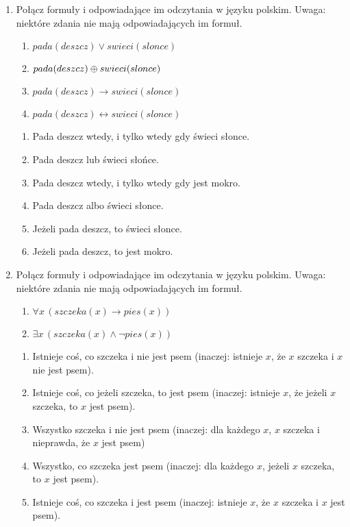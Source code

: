 \documentclass{mwart}
\newcommand{\xor}{\ensuremath\oplus}
\renewcommand{\iff}{\ensuremath\leftrightarrow}
\renewcommand{\iff}{\leftrightarrow}
\begin{document}
\begin{enumerate}
	\item Połącz formuły i odpowiadające im odczytania w języku polskim. Uwaga: niektóre zdania nie mają odpowiadających im formuł.
			\begin{multicols}{2}
	\begin{enumerate}
	\item $pada(deszcz) \lor swieci(slonce)$
	\item $pada(deszcz) \xor swieci(slonce)$
	\item $pada(deszcz) \to swieci(slonce)$
	\item $pada(deszcz) \iff swieci(slonce)$
		\end{enumerate}
		\columnbreak
	\begin{enumerate}
	\item Pada deszcz wtedy, i tylko wtedy gdy świeci słonce.
\item Pada deszcz lub świeci słońce.
\item Pada deszcz wtedy, i tylko wtedy gdy jest mokro.
\item Pada deszcz albo świeci słonce.
\item Jeżeli pada deszcz, to świeci słonce.
\item Jeżeli pada deszcz, to jest mokro.
	\end{enumerate}	
		\end{multicols}
	\item Połącz formuły i odpowiadające im odczytania w języku polskim. Uwaga: niektóre zdania nie mają odpowiadających im formuł.
			\begin{multicols}{2}
	\begin{enumerate}
	\item $\forall x\,(szczeka(x) \to pies(x))$
	\item $\exists x\,(szczeka(x) \land \lnot pies(x))$
	\end{enumerate}
	\columnbreak
	\begin{enumerate}
	\item Istnieje coś, co szczeka i nie jest psem (inaczej: istnieje $x$, że $x$ szczeka i $x$ nie jest psem).
\item Istnieje coś, co jeżeli szczeka, to jest psem (inaczej: istnieje $x$, że jeżeli $x$ szczeka, to $x$ jest psem).
\item Wszystko szczeka i nie jest psem (inaczej: dla każdego $x$, $x$ szczeka i nieprawda, że $x$ jest psem)
\item Wszystko, co szczeka jest psem (inaczej: dla każdego $x$, jeżeli $x$ szczeka, to $x$ jest psem).
\item Istnieje coś, co szczeka i jest psem (inaczej: istnieje $x$, że $x$ szczeka i $x$ jest psem).

\end{enumerate}
\end{multicols}
\end{enumerate}
\end{document}
